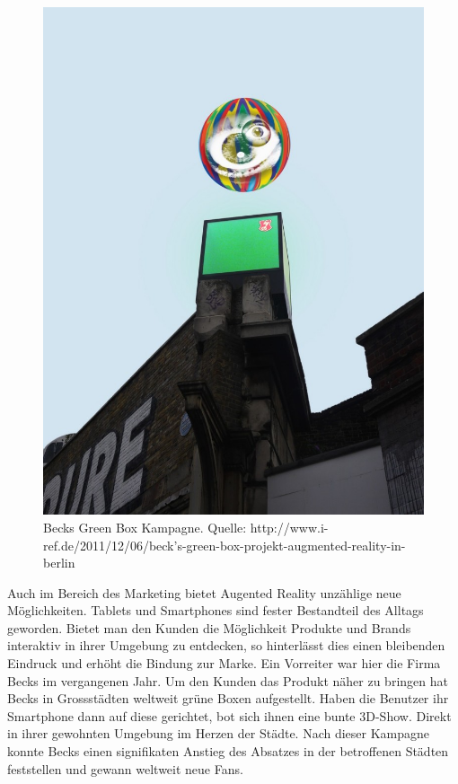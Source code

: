 \begin{figure}[!ht]
\centering
\includegraphics[scale=0.3]{images/ar-marketing} 
\caption{Becks Green Box Kampagne. Quelle: http://www.i-ref.de/2011/12/06/beck's-green-box-projekt-augmented-reality-in-berlin}
\label{fig:ar-marketing}
\end{figure}

Auch im Bereich des Marketing bietet Augented Reality unzählige neue Möglichkeiten. Tablets und Smartphones sind fester Bestandteil des Alltags geworden. Bietet man den Kunden die Möglichkeit Produkte und Brands interaktiv in ihrer Umgebung zu entdecken, so hinterlässt dies einen bleibenden Eindruck und erhöht die Bindung zur Marke. Ein Vorreiter war hier die Firma Becks im vergangenen Jahr. Um den Kunden das Produkt näher zu bringen hat Becks in Grossstädten weltweit grüne Boxen aufgestellt. Haben die Benutzer ihr Smartphone dann auf diese gerichtet, bot sich ihnen eine bunte 3D-Show. Direkt in ihrer gewohnten Umgebung im Herzen der Städte. Nach dieser Kampagne konnte Becks einen signifikaten Anstieg des Absatzes in der betroffenen Städten feststellen und gewann weltweit neue Fans.

